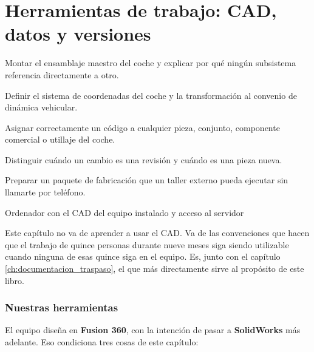 \chapter{Herramientas de trabajo: CAD, datos y versiones}
\label{ch:herramientas_cad_datos}

\begin{objetivos}
  \item Montar el ensamblaje maestro del coche y explicar por qué ningún
        subsistema referencia directamente a otro.
  \item Definir el sistema de coordenadas del coche y la transformación al
        convenio de dinámica vehicular.
  \item Asignar correctamente un código a cualquier pieza, conjunto, componente
        comercial o utillaje del coche.
  \item Distinguir cuándo un cambio es una revisión y cuándo es una pieza nueva.
  \item Preparar un paquete de fabricación que un taller externo pueda ejecutar
        sin llamarte por teléfono.
\end{objetivos}

%
{Ordenador con el CAD del equipo instalado y acceso al servidor}

Este capítulo no va de aprender a usar el CAD. Va de las convenciones que hacen
que el trabajo de quince personas durante nueve meses siga siendo utilizable
cuando ninguna de esas quince siga en el equipo. Es, junto con el capítulo
\ref{ch:documentacion_traspaso}, el que más directamente sirve al propósito de
este libro.

\subsection*{Nuestras herramientas}

El equipo diseña en \textbf{Fusion 360}, con la intención de pasar a
\textbf{SolidWorks} más adelante. Eso condiciona tres cosas de este capítulo:

